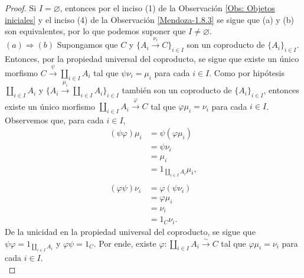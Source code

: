 \documentclass[tesis]{subfiles}
\begin{document}
\begin{proof}

    Si $I=\varnothing$, entonces por el inciso (1) de la Observación \ref{Obs: Objetos iniciales} y el inciso (4) de la Observación \ref{Mendoza-1.8.3} se sigue que (a) y (b) son equivalentes, por lo que podemos suponer que $I\neq\varnothing$. \\

    $(a)\Rightarrow(b)$ Supongamos que $C$ y $\{A_i\xrightarrow[]{\nu_i} C\}_{i\in I}$ son un coproducto de $\{A_i\}_{i\in I}$. Entonces, por la propiedad universal del coproducto, se sigue que existe un único morfismo $C\xrightarrow[]{\psi} \coprod_{i\in I}A_i$ tal que $\psi\nu_i=\mu_i$ para cada $i\in I$. Como por hipótesis $\coprod_{i\in I}A_i$ y $\{A_i\xrightarrow[]{\mu_i} \coprod_{i\in I}A_i\}_{i\in I}$ también son un coproducto de $\{A_i\}_{i\in I}$, entonces existe un único morfismo $\coprod_{i\in I}A_i\xrightarrow[]{\varphi} C$ tal que $\varphi\mu_i=\nu_i$ para cada $i\in I$. Observemos que, para cada $i\in I$,
    \begin{align*}
        (\psi\varphi)\mu_i &= \psi(\varphi\mu_i) \\
                           &= \psi\nu_i \\
                           &= \mu_i \\
                           &= 1_{\coprod_{i\in I}A_i}\mu_i, \\ \\
        (\varphi\psi)\nu_i &= \varphi(\psi\nu_i) \\
                           &= \varphi\mu_i \\
                           &= \nu_i \\
                           &= 1_C\nu_i.
    \end{align*}
    De la unicidad en la propiedad universal del coproducto, se sigue que $\psi\varphi=1_{\coprod_{i\in I}A_i}$ y $\varphi\psi=1_C$. Por ende, existe $\varphi:\coprod_{i\in I}A_i\xrightarrow[]{\sim}C$ tal que $\varphi\mu_i=\nu_i$ para cada $i\in I$. \\


\end{proof}
\end{document}
